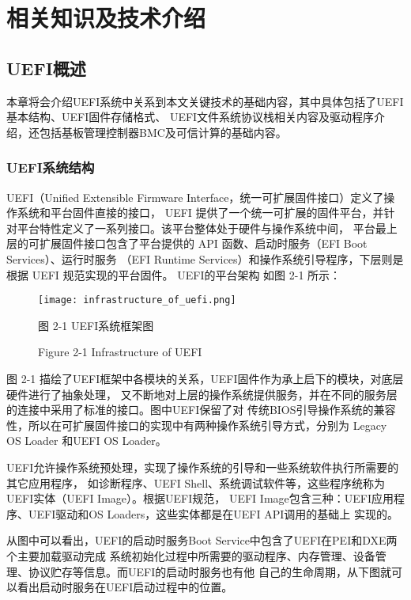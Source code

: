 %
%
\chapter{相关知识及技术介绍}

%
%
\section{UEFI概述}
本章将会介绍UEFI系统中关系到本文关键技术的基础内容，其中具体包括了UEFI基本结构、UEFI固件存储格式、
UEFI文件系统协议栈相关内容及驱动程序介绍，还包括基板管理控制器BMC及可信计算的基础内容。

\subsection{UEFI系统结构}
UEFI（Unified Extensible Firmware Interface，统一可扩展固件接口）定义了操作系统和平台固件直接的接口，
UEFI 提供了一个统一可扩展的固件平台，并针对平台特性定义了一系列接口。该平台整体处于硬件与操作系统中间，
平台最上层的可扩展固件接口包含了平台提供的 API 函数、启动时服务（EFI  Boot  Services）、运行时服务
（EFI  Runtime Services）和操作系统引导程序\cite{english21}，下层则是根据 UEFI 规范实现的平台固件。
UEFI的平台架构
如图 2-1 所示：

\begin{figure}[htb]
    \label{infrastructure_of_uefi}
    \vspace{0cm}
    \setlength{\abovecaptionskip}{0.3cm}
	\centering
    \texttt{[image: infrastructure\_of\_uefi.png]}
    \caption*{图 2-1 UEFI系统框架图}
    \setlength{\belowcaptionskip}{-0.7cm}
    \caption*{Figure 2-1 Infrastructure of UEFI}
\end{figure}

\par 图 2-1 描绘了UEFI框架中各模块的关系，UEFI固件作为承上启下的模块，对底层硬件进行了抽象处理，
又不断地对上层的操作系统提供服务，并在不同的服务层的连接中采用了标准的接口。图中UEFI保留了对
传统BIOS引导操作系统的兼容性，所以在可扩展固件接口的实现中有两种操作系统引导方式，分别为
Legacy OS Loader 和UEFI OS Loader。 
\par UEFI允许操作系统预处理，实现了操作系统的引导和一些系统软件执行所需要的其它应用程序，
如诊断程序、UEFI Shell、系统调试软件等，这些程序统称为UEFI实体（UEFI Image）。根据UEFI规范，
UEFI Image包含三种：UEFI应用程序、UEFI驱动和OS Loaders，这些实体都是在UEFI API调用的基础上
实现的。
\par 从图中可以看出，UEFI的启动时服务Boot Service中包含了UEFI在PEI和DXE两个主要加载驱动完成
系统初始化过程中所需要的驱动程序、内存管理、设备管理、协议贮存等信息。而UEFI的启动时服务也有他
自己的生命周期，从下图就可以看出启动时服务在UEFI启动过程中的位置\cite{chinese20}。

